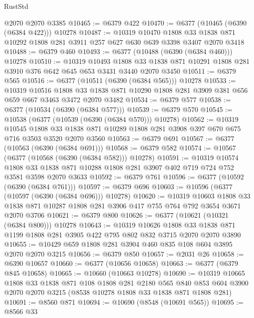 \begin{lexlean}{RustStd}
\begin{coremodule}
    @2070
    @2070
    @3385
@10465 := @6379 @422
@10470 := @6377 (@10465 (@6390 (@6384 @422))) @10278
@10487 := @10319
    @10470
    @1808
    @33
    @1838
    @871
    @10292
    @1808
    @281
    @3911
    @257
    @627
    @630
    @639
    @3398
    @3407
    @2070
    @3418
@10488 := @6379 @460
@10493 := @6377 (@10488 (@6390 (@6384 @460))) @10278
@10510 := @10319
    @10493
    @1808
    @33
    @1838
    @871
    @10291
    @1808
    @281
    @3910
    @376
    @642
    @645
    @653
    @3431
    @3440
    @2070
    @3450
@10511 := @6379 @565
@10516 := @6377 (@10511 (@6390 (@6384 @565))) @10278
@10533 := @10319
    @10516
    @1808
    @33
    @1838
    @871
    @10290
    @1808
    @281
    @3909
    @381
    @656
    @659
    @667
    @3463
    @3472
    @2070
    @3482
@10534 := @6379 @577
@10538 := @6377 (@10534 (@6390 (@6384 @577)))
@10539 := @6379 @570
@10545 := @10538 (@6377 (@10539 (@6390 (@6384 @570))) @10278)
@10562 := @10319
    @10545
    @1808
    @33
    @1838
    @871
    @10289
    @1808
    @281
    @3908
    @397
    @670
    @675
    @716
    @3503
    @3520
    @2070
    @3560
@10563 := @6379 @691
@10567 := @6377 (@10563 (@6390 (@6384 @691)))
@10568 := @6379 @582
@10574 := @10567 (@6377 (@10568 (@6390 (@6384 @582))) @10278)
@10591 := @10319
    @10574
    @1808
    @33
    @1838
    @871
    @10288
    @1808
    @281
    @3907
    @402
    @719
    @724
    @752
    @3581
    @3598
    @2070
    @3633
@10592 := @6379 @761
@10596 := @6377 (@10592 (@6390 (@6384 @761)))
@10597 := @6379 @696
@10603 := @10596 (@6377 (@10597 (@6390 (@6384 @696))) @10278)
@10620 := @10319
    @10603
    @1808
    @33
    @1838
    @871
    @10287
    @1808
    @281
    @3906
    @417
    @755
    @764
    @792
    @3654
    @3671
    @2070
    @3706
@10621 := @6379 @800
@10626 := @6377 (@10621 (@10321 (@6384 @800))) @10278
@10643 := @10319
    @10626
    @1808
    @33
    @1838
    @871
    @1199
    @1808
    @281
    @3905
    @422
    @795
    @802
    @832
    @3715
    @2070
    @2070
    @3890
@10655 := @10429 @659 @1808 @281 @3904 @460 @835 @108 @604 @3895 @2070 @2070 @3215
@10656 := @6379 @850
@10657 := @2031 @26
@10658 := @6390 @10657
@10660 := @6377 (@10656 @10658)
@10663 := @6377 (@6379 @845 @10658)
@10665 := @10660 (@10663 @10278)
@10690 := @10319
    @10665
    @1808
    @33
    @1838
    @871
    @108
    @1808
    @281
    @2180
    @565
    @840
    @853
    @604
    @3900
    @2070
    @2070
    @3215
    (@8538 @10278 @1808 @33 @1838 @871 @1808 @281)
@10691 := @8560 @871
@10694 := @10690 (@8548 (@10691 @565))
@10695 := @8566 @33

\end{coremodule}
\end{lexlean}
